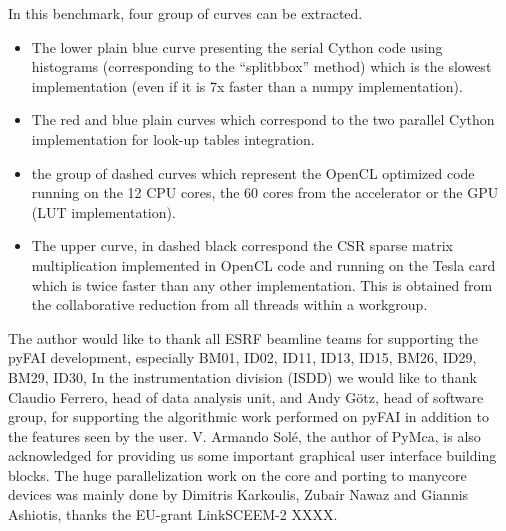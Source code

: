 \documentclass[preprint]{iucr}
\begin{document}
In this benchmark, four group of curves can be extracted.
\begin{itemize}
  \item The lower plain blue curve presenting the serial Cython code using
  histograms (corresponding to the ``splitbbox'' method) which is the slowest
  implementation (even if it is 7x faster than a numpy implementation).
  \item The red and blue plain curves which correspond to the two parallel
  Cython implementation for look-up tables integration.
  \item the group of dashed curves which represent the OpenCL optimized code
  running on the 12 CPU cores, the 60 cores from the accelerator or the GPU (LUT
  implementation).
  \item The upper curve, in dashed black correspond the CSR sparse matrix
  multiplication implemented in OpenCL code and running on the Tesla card which
  is twice faster than any other implementation. This is obtained from the
  collaborative reduction from all threads within a workgroup.
\end{itemize}  



The author would like to thank all ESRF beamline teams for supporting the pyFAI
development, especially BM01, ID02, ID11, ID13, ID15, BM26, ID29, BM29, ID30,
In the instrumentation division (ISDD) we would like to thank Claudio Ferrero,
head of data analysis unit, and Andy G\"otz, head of software group, for
supporting the algorithmic work performed on pyFAI in addition to the features
seen by the user.
V. Armando Solé, the author of PyMca, is also acknowledged for providing us some
important graphical user interface building blocks.  
The huge parallelization work on the core and porting to manycore devices
was mainly done by Dimitris Karkoulis, Zubair Nawaz and Giannis Ashiotis,
thanks the EU-grant LinkSCEEM-2 XXXX.
\end{document}
